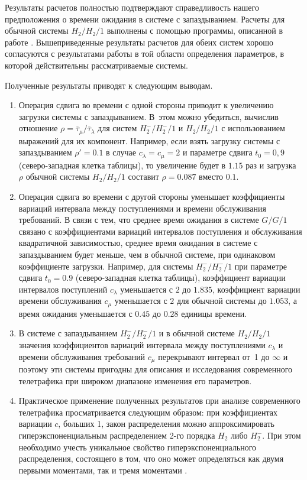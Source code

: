 Результаты расчетов полностью подтверждают справедливость нашего предположения о времени ожидания в системе с запаздыванием. Расчеты для обычной системы $H_2/H_2/1$ выполнены с помощью программы, описанной в работе \cite{tar:tarasov_4}. Вышеприведенные результаты расчетов для обеих систем хорошо согласуются с результатами работы \cite{tar:tarasov_5} в той области определения параметров, в которой действительны рассматриваемые системы.

\smallskip

Полученные результаты приводят к следующим выводам.
\begin{enumerate}
\item[1.] Операция сдвига во времени с одной стороны приводит к увеличению загрузки системы с запаздыванием. 
В~этом можно убедиться, вычислив отношение $\rho=\overline{\tau}_{\mu}/\overline{\tau}_{\lambda}$ для систем $H_2^-/H_2^-/1$ и $H_2/H_2/1$ с использованием выражений для их компонент. Например, если взять загрузку системы с запаздыванием $\rho'=0.1$ в случае $c_{\lambda}=c_{\mu}=2$ и параметре сдвига $t_0=0,9$ (северо-западная клетка таблицы), то увеличение будет в $1.15$ раз и загрузка $\rho$ обычной системы $H_2/H_2/1$ составит $\rho=0.087$ вместо $0.1$.
\item[2.] Операция сдвига во времени с другой стороны уменьшает коэффициенты вариаций интервала между поступлениями и времени обслуживания требований. В связи с тем, что среднее время ожидания в системе $G/G/1$ связано с коэффициентами вариаций интервалов поступления и обслуживания квадратичной зависимостью, среднее время ожидания в системе с запаздыванием будет меньше, чем в обычной системе, при одинаковом коэффициенте загрузки. 
Например, для системы $H_2^-/H_2^-/1$  при параметре сдвига $t_0=0.9$ (северо-западная клетка таблицы), коэффициент вариации интервалов поступлений $c_{\lambda}$ уменьшается с $2$ до $1.835$, коэффициент вариации времени обслуживания $c_{\mu}$ уменьшается с $2$ для обычной системы до $1.053$, а время ожидания уменьшается с $0.45$ до $0.28$ единицы времени.
\item[3.] В системе с запаздыванием  $H_2^-/H_2^-/1$ и в обычной системе $H_2/H_2/1$ значения коэффициентов вариаций интервала между поступлениями $c_{\lambda}$ и времени обслуживания требований $c_{\mu}$  перекрывают интервал от~1 до $\infty$ и поэтому эти системы пригодны для описания и исследования современного телетрафика при широком диапазоне изменения его параметров.
\item[4.] Практическое применение полученных результатов при анализе современного телетрафика просматривается следующим образом:  при коэффициентах вариации $c$, больших 1, закон распределения можно аппроксимировать гиперэкспоненциальным распределением 2-го порядка $H_2$ либо $H_2^-$. При этом необходимо учесть уникальное свойство гиперэкспоненциального распределения, состоящего в том, что оно может определяться как двумя первыми моментами, так и тремя моментами \cite{tar:tarasov_2}. 

\end{enumerate}
